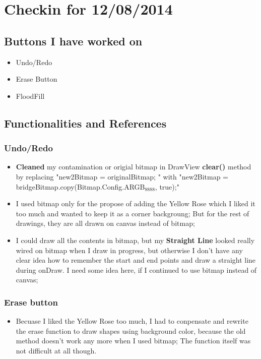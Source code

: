 \documentclass[9pt,b5paper]{article}
\begin{document}
\section{Checkin for 12/08/2014}
\label{sec-6}
\subsection{Buttons I have worked on}
\label{sec-6-1}
\begin{itemize}
\item Undo/Redo
\item Erase Button
\item FloodFill
\end{itemize}
\subsection{Functionalities and References}
\label{sec-6-2}
\subsubsection{Undo/Redo}
\label{sec-6-2-1}
\begin{itemize}
\item \textbf{Cleaned} my contamination or origial bitmap in DrawView \textbf{clear()} method by replacing "new2Bitmap = originalBitmap; " with "new2Bitmap = bridgeBitmap.copy(Bitmap.Config.ARGB$_{\text{8888}}$, true);"
\item I used bitmap only for the propose of adding the Yellow Rose which I liked it too much and wanted to keep it as a corner backgroung; But for the rest of drawings, they are all drawn on canvas instead of bitmap;
\item I could draw all the contents in bitmap, but my \textbf{Straight Line} looked really wired on bitmap when I draw in progress, but otherwise I don't have any clear idea how to remember the start and end points and draw a straight line during onDraw. I need some idea here, if I continued to use bitmap instead of canvas;
\end{itemize}
\subsubsection{Erase button}
\label{sec-6-2-2}
\begin{itemize}
\item Becuase I liked the Yellow Rose too much, I had to conpensate and rewrite the erase function to draw shapes using background color, because the old method doesn't work any more when I used bitmap; The function itself was not difficult at all though.
\end{itemize}
\end{document}
